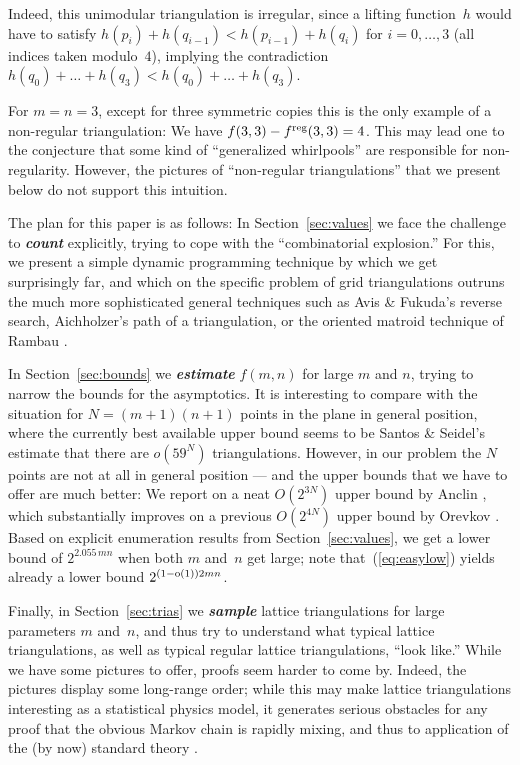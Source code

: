 Indeed, this unimodular triangulation is irregular, since a lifting
function~$h$ would have to satisfy
$h(p_i)+h(q_{i-1})<h(p_{i-1})+h(q_i)$ for $i=0,\dots,3$ (all indices
taken modulo~$4$), implying the contradiction $h(q_0)+\dots+
h(q_3)<h(q_0)+\dots+ h(q_3)$.

For $m=n=3$, except for three symmetric copies
this is the only example of a non-regular triangulation: We
have $f(3,3)-f^{\mathrm{reg}}(3,3)=4$.
This may lead one to the conjecture that some kind of
``generalized whirlpools'' are responsible for non-regularity.
However, the pictures of ``non-regular triangulations''
that we present below do not support this intuition.
\medskip

The plan for this paper is as follows:
In Section~\ref{sec:values} we face the challenge to
\emph{\bfseries count} explicitly, trying to cope with the
``combinatorial explosion.''
For this, we present a simple dynamic programming technique by which we
get surprisingly far, and which on the specific problem of
grid triangulations outruns the much more
sophisticated general techniques such as 
Avis \& Fukuda's \cite{AvisFukuda} reverse search, 
Aichholzer's \cite{Aichholzer-path} path of a triangulation,
or the oriented matroid technique of Rambau \cite{Rambau-TOPCOM}.

In Section~\ref{sec:bounds} we \emph{\bfseries estimate} $f(m,n)$ for
large $m$ and $n$, trying to narrow the bounds for the asymptotics.
It is interesting to compare with the situation for $N=(m+1)(n+1)$
points in the plane in general position, where the currently best
available upper bound seems to be Santos \& Seidel's
\cite{SantosSeidel} estimate that there are $o(59^N)$ triangulations.
However, in our problem the $N$ points are not at all in general
position --- and the upper bounds that we have to offer are much
better: We report on a neat $O(2^{3N})$ upper bound by Anclin
\cite{Anclin}, which substantially improves on a previous $O(2^{4N})$
upper bound by Orevkov \cite{Orevkov}.  Based on explicit enumeration
results from Section~\ref{sec:values}, we get a lower bound of
$2^{2.055\,mn}$ when both $m$ and~$n$ get large; note
that~(\ref{eq:easylow}) yields already a lower bound
$2^{(1-\operatorname{o}(1))2mn}$.

Finally, in Section~\ref{sec:trias} 
we \emph{\bfseries sample} lattice triangulations for large parameters
$m$ and~$n$,
and thus try to understand what typical lattice triangulations,
as well as typical regular lattice triangulations, ``look like.''
While we have some pictures to offer, proofs seem harder to come by.
Indeed, the pictures display some long-range order;
while this may make lattice triangulations interesting as a
statistical physics model, it generates serious obstacles for any proof that
the obvious Markov chain is rapidly mixing, and thus to
application of the (by now) standard theory \cite{Behrends-MarkovChains}.


